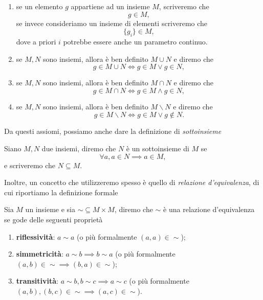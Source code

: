 \begin{enumerate}
	\item se un elemento $g$ appartiene ad un insieme $M$, scriveremo che
	\begin{equation}
		g \in M,
	\end{equation}
	se invece consideriamo un insieme di elementi scriveremo che
	\begin{equation}
		\{ g_i \} \in M,
	\end{equation}
	dove a priori $i$ potrebbe essere anche un parametro continuo.
	\item se $M, N$ sono insiemi, allora è ben definito $M \cup N$ e diremo che
	\begin{equation}
		g \in M \cup N \iff g \in M \vee g \in N,
	\end{equation}
	\item se $M, N$ sono insiemi, allora è ben definito $M \cap N$ e diremo che
	\begin{equation}
		g \in M \cap N \iff g \in M \wedge g \in N,
	\end{equation}
	\item se $M, N$ sono insiemi, allora è ben definito $M \backslash N$ e diremo che
	\begin{equation}
		g \in M \backslash N \iff g \in M \vee g \not\in N.
	\end{equation}
\end{enumerate}

Da questi assiomi, possiamo anche dare la definizione di \emph{sottoinsieme}
\begin{definition}[sottoinsieme]
	Siano $M, N$ due insiemi, diremo che $N$ è un sottoinsieme di $M$ se
	\begin{equation}
		\forall a, a \in N \implies a \in M,
	\end{equation}
	e scriveremo che $N \subseteq M$.
\end{definition}

Inoltre, un concetto che utilizzeremo spesso è quello di \emph{relazione d'equivalenza}, di cui riportiamo la definizione formale

\begin{definition}
	Sia $M$ un insieme e sia $\sim \subseteq M \times M$, diremo che $\sim$ è una relazione d'equivalenza se gode delle seguenti proprietà
	\begin{enumerate}[label=\protect\circled{\arabic*}]
		\item \textbf{riflessività}: $a \sim a$ (o più formalmente $(a, a) \in \sim$);
		\item \textbf{simmetricità}: $a \sim b \implies b \sim a$ (o più formalmente $(a, b) \in \sim \implies (b, a) \in \sim$);
		\item \textbf{transitività}: $a \sim b, b \sim c \implies a \sim c$ (o più formalmente $(a, b), (b, c) \in \sim \implies (a, c) \in \sim$).
	\end{enumerate}
\end{definition}

